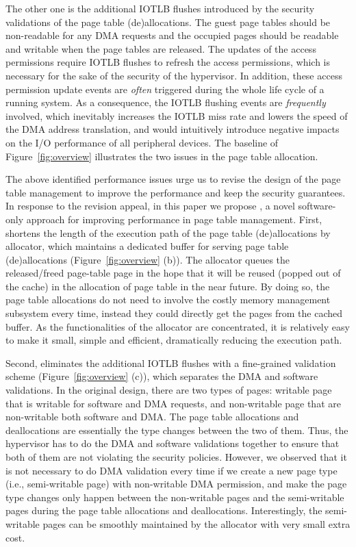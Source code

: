 The other one is the additional IOTLB flushes introduced by the security validations of the page table (de)allocations.
The guest page tables should be non-readable for any DMA requests and the occupied pages should be readable and writable when the page tables are released.
The updates of the access permissions require IOTLB flushes to refresh the access permissions, which is necessary for the sake of the security of the hypervisor.
In addition, these access permission update events are \emph{often} triggered during the whole life cycle of a running system.
As a consequence, the IOTLB flushing events are \emph{frequently} involved, which inevitably increases the IOTLB miss rate and lowers the speed of the DMA address translation, and would intuitively introduce negative impacts on the I/O performance of all peripheral devices.
The baseline of Figure~\ref{fig:overview} illustrates the two issues in the page table allocation.

The above identified performance issues urge us to revise the design of the page table management to improve the performance and keep the security guarantees.
In response to the revision appeal, in this paper we propose \name, a novel software-only approach for improving performance in page table management.
First, \name shortens the length of the execution path of the page table (de)allocations by \name allocator, which maintains a dedicated buffer for serving page table (de)allocations (Figure~\ref{fig:overview} (b)).
The \name allocator queues the released/freed page-table page in the hope that
it will be reused (popped out of the cache) in the allocation of page table in the near future.
By doing so, the page table allocations do not need to involve the costly memory management subsystem every time, instead they could directly get the pages from the cached buffer.
As the functionalities of the \name allocator are concentrated, it is relatively easy to make it small, simple and efficient, dramatically reducing the execution path.

Second, \name eliminates the additional IOTLB flushes with a fine-grained validation scheme (Figure~\ref{fig:overview} (c)), which separates the DMA and software validations.
In the original design, there are two types of pages: writable page that is writable for software and DMA requests, and non-writable page that are non-writable both software and DMA.
The page table allocations and deallocations are essentially the type changes between the two of them.
Thus, the hypervisor has to do the DMA and software validations together to ensure that both of them are not violating the security policies.
However, we observed that it is not necessary to do DMA validation every time if we create a new page type (i.e., semi-writable page) with non-writable DMA permission, and make the page type changes only happen between the non-writable pages and the semi-writable pages during the page table allocations and deallocations.
Interestingly, the semi-writable pages can be smoothly maintained by the \name allocator with very small extra cost.

